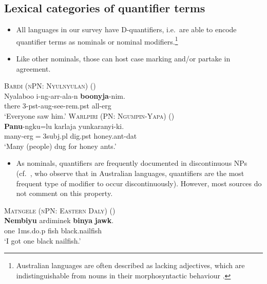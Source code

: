\documentclass{article}
\begin{document}
\subsection{Lexical categories of quantifier terms}
\begin{itemize}
\item All languages in our survey have D-quantifiers, i.e.\ are able to encode quantifier terms as nominals or nominal modifiers.\footnote{Australian languages are often described as lacking adjectives, which are indistinguishable from nouns in their morphosyntactic behaviour \citep[e.g.,][102]{mcgregor04}.}
\item Like other nominals, those can host case marking and/or partake in agreement.
\end{itemize}

\begin{exe}
  \ex\label{allerg} \textsc{Bardi (nPN: Nyulnyulan)} (\citealt[272]{bowern12})\\
  \gll Nyalaboo i-ng-arr-ala-n \textbf{boonyja}-nim.\\
  there 3-{\sc pst}-{\sc aug}-see-{\sc rem.pst} all-{\sc erg}\\
  \glt `Everyone saw him.'
  \ex \textsc{Warlpiri (PN: Ngumpin-Yapa)} (\citealt[6]{bowler17})\\
  \gll \textbf{Panu}-ngku=lu karlaja yunkaranyi-ki.\\
  many-{\sc erg}$=${\sc 3subj.pl} dig.{\sc pst} honey.ant-{\sc dat}\\
  \glt `Many (people) dug for honey ants.'
\end{exe}

\begin{itemize}
\item As nominals, quantifiers are frequently documented in discontinuous NPs (cf.\ \citealt[51--52]{louagieverstraete16}, who observe that in Australian languages, quantifiers are the most frequent type of modifier to occur discontinuously). However, most sources do not comment on this property.
\end{itemize}

\begin{exe}
  \ex \textsc{Matngele (nPN: Eastern Daly)} (\citealt[54]{zandvoort99})\\
  \gll \textbf{Nembiyu} ardiminek \textbf{binya} \textbf{jawk}.\\
  one 1{\sc ms.}do.{\sc p} fish black.nailfish\\
  \glt `I got one black nailfish.' %
\end{exe}
\end{document}
